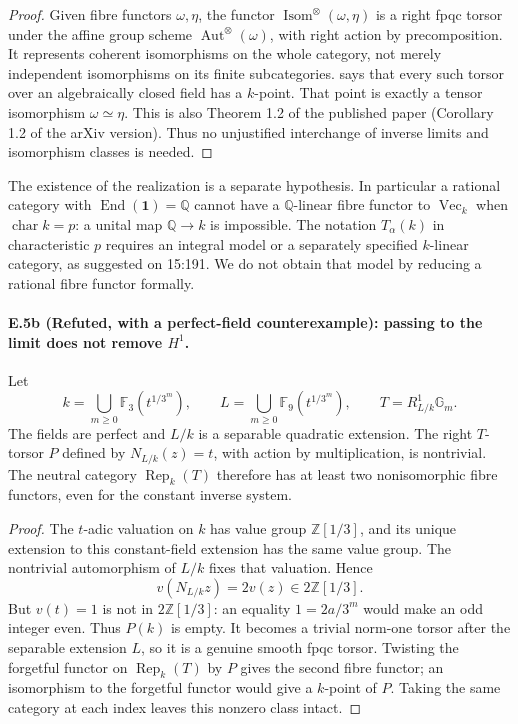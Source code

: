 \begin{proof}
Given fibre functors $\omega,\eta$, the functor
$\operatorname{Isom}^{\otimes}(\omega,\eta)$ is a right fpqc torsor under
the affine group scheme $\operatorname{Aut}^{\otimes}(\omega)$, with
right action by precomposition. It represents coherent isomorphisms
on the whole category, not merely independent isomorphisms on its finite
subcategories. \citet[Theorem 1.1]{D_Wibmer2025} says that every such
torsor over an algebraically closed field has a $k$-point. That point is
exactly a tensor isomorphism $\omega\simeq\eta$. This is also Theorem 1.2
of the published paper (Corollary 1.2 of the arXiv version). Thus no
unjustified interchange of inverse limits and isomorphism classes is
needed.
\end{proof}

The existence of the realization is a separate hypothesis. In particular
a rational category with $\operatorname{End}(\mathbf1)=\mathbb Q$ cannot
have a $\mathbb Q$-linear fibre functor to $\operatorname{Vec}_k$ when
$\operatorname{char}k=p$: a unital map $\mathbb Q\to k$ is impossible.
The notation $T_\alpha(k)$ in characteristic $p$ requires an integral
model or a separately specified $k$-linear category, as suggested on
15:191. We do not obtain that model by reducing a rational fibre functor
formally.

\paragraph{E.5b (Refuted, with a perfect-field counterexample): passing to the limit does not remove $H^1$.}
Let
\[
 k=\bigcup_{m\geq0}\mathbb F_3(t^{1/3^m}),\qquad
 L=\bigcup_{m\geq0}\mathbb F_9(t^{1/3^m}),\qquad
 T=R^1_{L/k}\mathbb G_m.
\]
The fields are perfect and $L/k$ is a separable quadratic extension.
The right $T$-torsor $P$ defined by $N_{L/k}(z)=t$, with action by
multiplication, is nontrivial. The neutral category $\operatorname{Rep}_k(T)$
therefore has at least two nonisomorphic fibre functors, even for the
constant inverse system.

\begin{proof}
The $t$-adic valuation on $k$ has value group $\mathbb Z[1/3]$, and its
unique extension to this constant-field extension has the same value
group. The nontrivial automorphism of $L/k$ fixes that valuation. Hence
\[
 v(N_{L/k}z)=2v(z)\in2\mathbb Z[1/3].
\]
But $v(t)=1$ is not in $2\mathbb Z[1/3]$: an equality
$1=2a/3^m$ would make an odd integer even. Thus $P(k)$ is empty.
It becomes a trivial norm-one torsor after the separable extension $L$,
so it is a genuine smooth fpqc torsor. Twisting the forgetful functor
on $\operatorname{Rep}_k(T)$ by $P$ gives the second fibre functor;
an isomorphism to the forgetful functor would give a $k$-point of $P$.
Taking the same category at each index leaves this nonzero class intact.
\end{proof}


